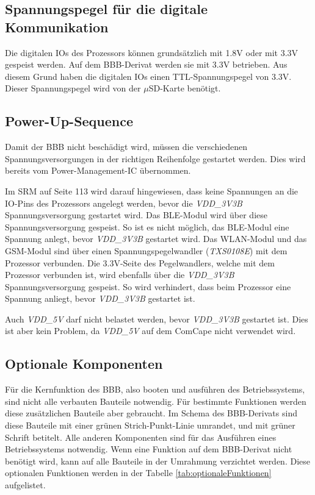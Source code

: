 \subsection{Spannungspegel für die digitale Kommunikation}
Die digitalen IOs des Prozessors können grundsätzlich mit 1.8V oder mit 3.3V gespeist werden. Auf dem BBB-Derivat werden sie mit 3.3V betrieben. Aus diesem Grund haben die digitalen IOs einen TTL-Spannungspegel von 3.3V. Dieser Spannungspegel wird von der $\mu$SD-Karte benötigt.

\subsection{Power-Up-Sequence}
Damit der BBB nicht beschädigt wird, müssen die verschiedenen Spannungsversorgungen in der richtigen Reihenfolge gestartet werden. Dies wird bereits vom Power-Management-IC übernommen.

Im SRM \cite{adafruitSRM} auf Seite 113 wird darauf hingewiesen, dass keine Spannungen an die IO-Pins des Prozessors angelegt werden, bevor die \textit{VDD\_3V3B} Spannungsversorgung gestartet wird. Das BLE-Modul wird über diese Spannungsversorgung gespeist. So ist es nicht möglich, das BLE-Modul eine Spannung anlegt, bevor \textit{VDD\_3V3B} gestartet wird.
Das WLAN-Modul und das GSM-Modul sind über einen Spannungspegelwandler (\textit{TXS0108E}) mit dem Prozessor verbunden. Die 3.3V-Seite des Pegelwandlers, welche mit dem Prozessor verbunden ist, wird ebenfalls über die \textit{VDD\_3V3B} Spannungsversorgung gespeist. So wird verhindert, dass beim Prozessor eine Spannung anliegt, bevor \textit{VDD\_3V3B} gestartet ist.

Auch \textit{VDD\_5V} darf nicht belastet werden, bevor \textit{VDD\_3V3B} gestartet ist. Dies ist aber kein Problem, da \textit{VDD\_5V} auf dem ComCape nicht verwendet wird.

\subsection{Optionale Komponenten}
Für die Kernfunktion des BBB, also booten und ausführen des Betriebssystems, sind nicht alle verbauten Bauteile notwendig. Für bestimmte Funktionen werden diese zusätzlichen Bauteile aber gebraucht. Im Schema des BBB-Derivats sind diese Bauteile mit einer grünen Strich-Punkt-Linie umrandet, und mit grüner Schrift betitelt. Alle anderen Komponenten sind für das Ausführen eines Betriebssystems notwendig. Wenn eine Funktion auf dem BBB-Derivat nicht benötigt wird, kann auf alle Bauteile in der Umrahmung verzichtet werden. Diese optionalen Funktionen werden in der Tabelle \ref{tab:optionaleFunktionen} aufgelistet.



